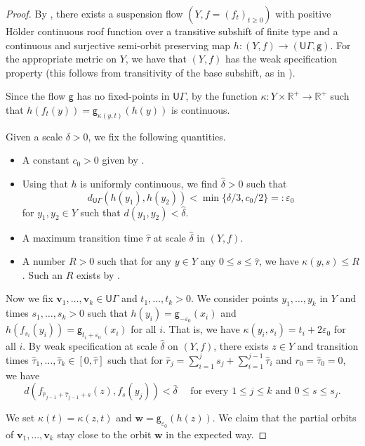 \documentclass[twoside]{amsart}
\theoremstyle{definition}
\numberwithin{equation}{section}
\numberwithin{theorem}{section}
\newcommand{\msf}[1]{\mathsf{#1}}
\newcommand{\R}{\mathbb{R}}
\newcommand{\G}{\Gamma}
\newcommand{\del}{\delta}
\newcommand{\ep}{\epsilon}
\renewcommand{\epsilon}{\varepsilon}
\renewcommand{\k}{\kappa}
\newcommand{\ra}{\rightarrow}
\newcommand{\wh}{\widehat}
\newcommand{\vv}{\mathbf{v}}
\newcommand{\vw}{\mathbf{w}}
\newcommand{\UG}{\msf{U}\G}
\newcommand{\vg}{\msf{g}}
\begin{document}
\begin{proof}
By \cite[Theorem~1.1]{cantrell-tanaka.invariant}, there exists a suspension flow $(Y,f=(f_t)_{t\geq 0})$ with positive H\"older continuous roof function over a transitive subshift of finite type and a continuous and surjective semi-orbit preserving map $h:(Y,f)\ra (\UG,\vg)$. For the appropriate metric on $Y$, we have that $(Y,f)$ has the weak specification property (this follows from transitivity of the base subshift, as in \cite[Proposition~2.2]{CLT.weak}).


Since the flow $\vg$ has no fixed-points in $\UG$, by \cite[Proposition~2.4]{CLT.weak} the function $\k: Y \times \R^+\ra \R^+$ such that $h(f_t(y))=\vg_{\k(y,t)}(h(y))$ is continuous.

Given a scale $\del>0$, we fix the following quantities.
\begin{itemize}
\item A constant $c_0>0$ given by .
\item Using that $h$ is uniformly continuous, we find $\wh\del>0$ such that $$d_{\UG}(h(y_1),h(y_2))<\min\{\del/3,c_0/2\}=:\ep_0$$ for $y_1,y_2\in Y$ such that $d(y_1,y_2)<\wh\del$.
    
  
    \item A maximum transition time $\wh\tau$ at scale $\wh\del$ in $(Y,f)$.
    \item A number $R>0$ such that for any $y\in Y$ any $0\leq s \leq \wh\tau$, we have $\k(y,s)\leq R$. Such an $R$ exists by \cite[Corollary~2.5]{CLT.weak}.
\end{itemize}

Now we fix $\vv_1,\dots,\vv_k\in \UG$ and $t_1,\dots,t_k>0$. We consider points $y_1,\dots,y_k$ in $Y$ and times $s_1,\dots,s_k>0$ such that $h(y_i)=\vg_{-\ep_0}(x_i)$ and $h(f_{s_i}(y_i))=\vg_{t_i+\ep_0}(x_i)$ for all $i$. That is, we have $\k(y_i,s_i)=t_i+2\ep_0$ for all $i$. By weak specification at scale $\wh\del$ on $(Y,f)$, there exists $z\in Y$ and transition times $\wh\tau_1,\dots,\wh\tau_k\in [0,\wh\tau]$ such that for $\wh{r}_j=\sum_{i=1}^j{s_j}+\sum_{i=1}^{j-1}{\wh\tau_i}$ and $r_0=\wh\tau_0=0$, we have 
\begin{equation}\label{eq:defWEPproof}
   d(f_{\wh{r}_{j-1}+\wh\tau_{j-1}+s}(z), f_s(y_j)) < \wh\del \quad \text{ for every } 1\leq j\leq k \text{ and }0\leq s\leq s_j.  
\end{equation}

We set $\k(t)=\k(z,t)$ and $\vw=\vg_{\ep_0}(h(z))$. We claim that the partial orbits of $\vv_1,\dots,\vv_k$ stay close to the orbit $\vw$ in the expected way. 


\end{proof}
\end{document}

